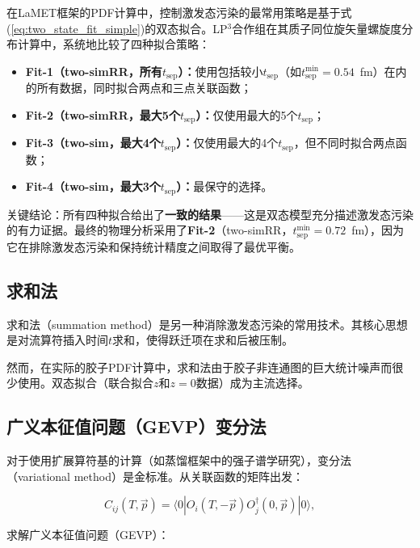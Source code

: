 \documentclass[12pt,a4paper]{ctexart}
\theoremstyle{definition}
\begin{document}
在LaMET框架的PDF计算中，控制激发态污染的最常用策略是基于式(\ref{eq:two_state_fit_simple})的双态拟合。LP$^3$合作组在其质子同位旋矢量螺旋度分布计算中\cite{LP3helicity}，系统地比较了四种拟合策略：

\begin{itemize}
    \item \textbf{Fit-1（two-simRR，所有$t_{\text{sep}}$）：}使用包括较小$t_{\text{sep}}$（如$t_{\text{sep}}^{\text{min}} = 0.54$~fm）在内的所有数据，同时拟合两点和三点关联函数；
    \item \textbf{Fit-2（two-simRR，最大5个$t_{\text{sep}}$）：}仅使用最大的5个$t_{\text{sep}}$；
    \item \textbf{Fit-3（two-sim，最大4个$t_{\text{sep}}$）：}仅使用最大的4个$t_{\text{sep}}$，但不同时拟合两点函数；
    \item \textbf{Fit-4（two-sim，最大3个$t_{\text{sep}}$）：}最保守的选择。
\end{itemize}

关键结论\cite{LP3helicity}：所有四种拟合给出了\textbf{一致的结果}——这是双态模型充分描述激发态污染的有力证据。最终的物理分析采用了\textbf{Fit-2}（two-simRR，$t_{\text{sep}}^{\text{min}} = 0.72$~fm），因为它在排除激发态污染和保持统计精度之间取得了最优平衡。

\subsection{求和法}

求和法（summation method）是另一种消除激发态污染的常用技术。其核心思想是对流算符插入时间$t$求和，使得跃迁项在求和后被压制。

然而，在实际的胶子PDF计算中\cite{Chen2025gluon}，求和法由于胶子非连通图的巨大统计噪声而很少使用。双态拟合（联合拟合$z$和$z=0$数据）成为主流选择。

\subsection{广义本征值问题（GEVP）变分法}

对于使用扩展算符基的计算（如蒸馏框架中的强子谱学研究），变分法（variational method）是金标准\cite{Egerer2021a,UKQCD1993}。从关联函数的矩阵出发：

\begin{equation}
C_{ij}(T, \vec{p}) = \langle 0| O_i(T, -\vec{p}) O^\dagger_j(0, \vec{p}) |0\rangle,
\label{eq:corr_matrix}
\end{equation}

求解广义本征值问题（GEVP）：
\end{document}
